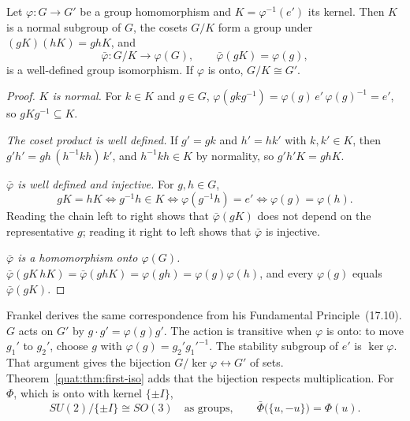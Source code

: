 \begin{theorem}\label{quat:thm:first-iso}
Let $\varphi\colon G\to G'$ be a group homomorphism and
$K=\varphi^{-1}(e')$ its kernel. Then $K$ is a normal subgroup of $G$, the
cosets $G/K$ form a group under $(gK)(hK)=ghK$, and
\begin{equation}
 \bar\varphi\colon G/K\to\varphi(G),\qquad \bar\varphi(gK)=\varphi(g),
\end{equation}
is a well-defined group isomorphism. If $\varphi$ is onto, $G/K\cong G'$.
\end{theorem}
\begin{proof}
\emph{$K$ is normal.} For $k\in K$ and $g\in G$,
$\varphi(gkg^{-1})=\varphi(g)\,e'\,\varphi(g)^{-1}=e'$, so $gKg^{-1}\subseteq K$.

\emph{The coset product is well defined.} If $g'=gk$ and $h'=hk'$ with
$k,k'\in K$, then $g'h'=gh\,(h^{-1}kh)\,k'$, and $h^{-1}kh\in K$ by
normality, so $g'h'K=ghK$.

\emph{$\bar\varphi$ is well defined and injective.} For $g,h\in G$,
\begin{equation}
 gK=hK\iff g^{-1}h\in K\iff\varphi(g^{-1}h)=e'\iff\varphi(g)=\varphi(h).
\end{equation}
Reading the chain left to right shows that $\bar\varphi(gK)$ does not depend
on the representative $g$; reading it right to left shows that $\bar\varphi$
is injective.

\emph{$\bar\varphi$ is a homomorphism onto $\varphi(G)$.}
$\bar\varphi(gK\,hK)=\bar\varphi(ghK)=\varphi(gh)=\varphi(g)\varphi(h)$, and
every $\varphi(g)$ equals $\bar\varphi(gK)$.
\end{proof}
Frankel derives the same correspondence from his Fundamental
Principle~(17.10). $G$ acts on $G'$ by $g\cdot g'=\varphi(g)g'$. The action
is transitive when $\varphi$ is onto: to move $g_1'$ to $g_2'$, choose $g$
with $\varphi(g)=g_2'g_1'^{-1}$. The stability subgroup of $e'$ is
$\ker\varphi$. That argument gives the bijection
$G/\ker\varphi\leftrightarrow G'$ of sets.
Theorem~\ref{quat:thm:first-iso} adds that the bijection respects
multiplication. For $\Phi$, which is onto with kernel $\{\pm I\}$,
\begin{equation}\label{quat:SO3-quotient}
 SU(2)/\{\pm I\}\cong SO(3)\quad\text{as groups},\qquad
 \bar\Phi\bigl(\{u,-u\}\bigr)=\Phi(u).
\end{equation}

